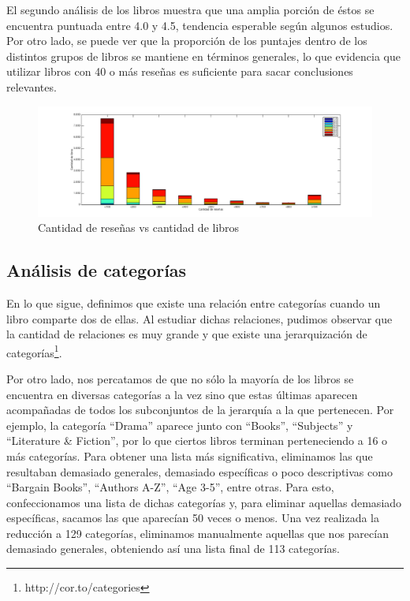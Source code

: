 \documentclass[12pt,journal,compsoc]{IEEEtran}
\begin{document}
El segundo análisis de los libros muestra que una amplia porción de éstos se encuentra puntuada entre 4.0 y 4.5, tendencia esperable según algunos estudios\cite{zhang}. Por otro lado, se puede ver que la proporción de los puntajes dentro de los distintos grupos de libros se mantiene en términos generales, lo que evidencia que utilizar libros con 40 o más reseñas es suficiente para sacar conclusiones relevantes.

\begin{figure}[H]
  \includegraphics[width=7.0in]{imgs/cantLibrosVScantReviews.png}
  \caption{Cantidad de reseñas vs cantidad de libros}
\end{figure}
\subsection{Análisis de categorías}

En lo que sigue, definimos que existe una relación entre categorías cuando un libro comparte dos de ellas. Al estudiar dichas relaciones, pudimos observar que la cantidad de relaciones es muy grande y que existe una jerarquización de categorías\footnote{http://cor.to/categories}.

Por otro lado, nos percatamos de que no sólo la mayoría de los libros se encuentra en diversas categorías a la vez sino que estas últimas aparecen acompañadas de todos los subconjuntos de la jerarquía a la que pertenecen. Por ejemplo, la categoría ``Drama'' aparece junto con ``Books'', ``Subjects'' y ``Literature \& Fiction'', por lo que ciertos libros terminan perteneciendo a 16 o más categorías. Para obtener una lista más significativa, eliminamos las que resultaban demasiado generales, demasiado específicas o poco descriptivas como ``Bargain Books'', ``Authors A-Z'', ``Age 3-5'', entre otras. Para esto, confeccionamos una lista de dichas categorías y, para eliminar aquellas demasiado específicas, sacamos las que aparecían 50 veces o menos. Una vez realizada la reducción a 129 categorías, eliminamos manualmente aquellas que nos parecían demasiado generales, obteniendo así una lista final de 113 categorías.
\end{document}
